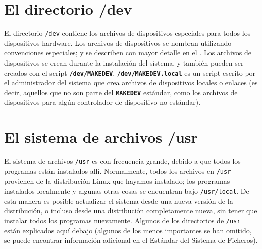 \section{ El directorio /dev}

El directorio \texttt{/dev} contiene los archivos de
dispositivos especiales para todos los dispositivos hardware. Los archivos de
dispositivos se nombran utilizando convenciones especiales; y se describen
con mayor detalle 
en el 
. Los archivos de dispositivos se crean durante
la instalación del sistema, y también pueden ser creados con el script
\texttt{\textbf{/dev/MAKEDEV}}. \texttt{\textbf{/dev/MAKEDEV.local}} es un
script escrito por el administrador del sistema que crea archivos de
dispositivos locales o enlaces (es decir, aquellos que no son parte del
\texttt{\textbf{MAKEDEV}} estándar, como los archivos de dispositivos para algún
controlador de dispositivo no estándar).  




\section{ El sistema de archivos /usr}

El sistema de archivos \texttt{/usr} es con frecuencia grande,
debido a que todos los programas están instalados allí. Normalmente, todos los
archivos en \texttt{/usr} provienen de la distribución Linux que
hayamos instalado; los programas instalados localmente y algunas otras cosas
se encuentran bajo \texttt{/usr/local}. De esta manera es posible
actualizar el sistema desde una nueva versión de la distribución, o incluso
desde una distribución completamente nueva, sin tener que instalar todos los
programas nuevamente. Algunos de los directorios de \texttt{/usr}
están explicados aquí debajo (algunos de los menos importantes se han omitido,
se puede encontrar información adicional en el Estándar del Sistema de
Ficheros).  


